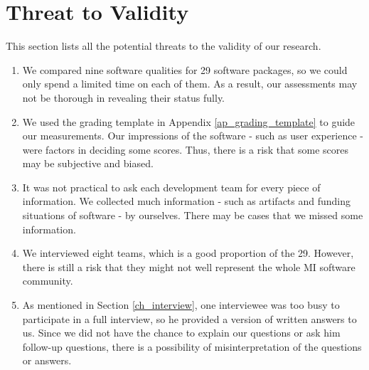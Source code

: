 \chapter{Threat to Validity}
\label{ch_validity}

This section lists all the potential threats to the validity of our research.

\begin{enumerate}
\item We compared nine software qualities for 29 software packages, so we could only spend a limited time on each of them. As a result, our assessments may not be thorough in revealing their status fully.
\item We used the grading template in Appendix \ref{ap_grading_template} to guide our measurements. Our impressions of the software - such as user experience - were factors in deciding some scores. Thus, there is a risk that some scores may be subjective and biased.
\item It was not practical to ask each development team for every piece of information. We collected much information - such as artifacts and funding situations of software - by ourselves. There may be cases that we missed some information.
\item We interviewed eight teams, which is a good proportion of the 29. However, there is still a risk that they might not well represent the whole MI software community.
\item As mentioned in Section \ref{ch_interview}, one interviewee was too busy to participate in a full interview, so he provided a version of written answers to us. Since we did not have the chance to explain our questions or ask him follow-up questions, there is a possibility of misinterpretation of the questions or answers.
\end{enumerate}

